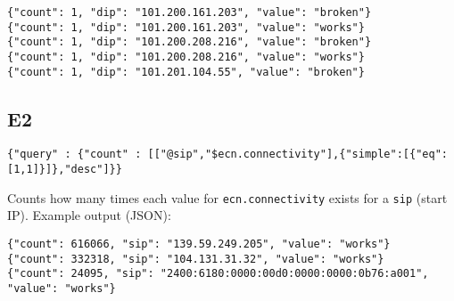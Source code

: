\documentclass[a4paper]{article}
\begin{document}
\begin{tiny}
\begin{verbatim}
{"count": 1, "dip": "101.200.161.203", "value": "broken"}
{"count": 1, "dip": "101.200.161.203", "value": "works"}
{"count": 1, "dip": "101.200.208.216", "value": "broken"}
{"count": 1, "dip": "101.200.208.216", "value": "works"}
{"count": 1, "dip": "101.201.104.55", "value": "broken"}
\end{verbatim}
\end{tiny}

\subsection{E2}

\begin{tiny}
\begin{verbatim}
{"query" : {"count" : [["@sip","$ecn.connectivity"],{"simple":[{"eq":[1,1]}]},"desc"]}}
\end{verbatim}
\end{tiny}

Counts how many times each value for \verb|ecn.connectivity| exists
for a \verb|sip| (start IP). Example output (JSON):

\begin{tiny}
\begin{verbatim}
{"count": 616066, "sip": "139.59.249.205", "value": "works"}
{"count": 332318, "sip": "104.131.31.32", "value": "works"}
{"count": 24095, "sip": "2400:6180:0000:00d0:0000:0000:0b76:a001", "value": "works"}
\end{verbatim}
\end{tiny}
\end{document}
